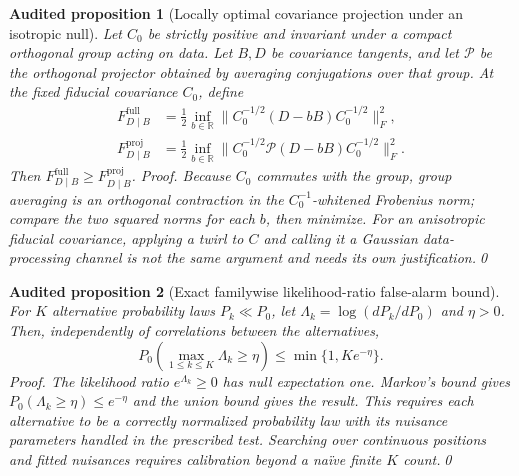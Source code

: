 \documentclass[aps,prd,onecolumn,notitlepage,groupedaddress,11pt]{revtex4-2}
\newtheorem{auditprop}{Audited proposition}[section]
\begin{document}
\begin{auditprop}[Locally optimal covariance projection under an isotropic null]\label{audit:fisher}
Let $C_0$ be strictly positive and invariant under a compact orthogonal group acting on data. Let $B,D$ be covariance tangents, and let $\mathcal P$ be the orthogonal projector obtained by averaging conjugations over that group. At the \emph{fixed fiducial covariance} $C_0$, define
\begin{align}\label{audit:fisherbound}
F_{D\mid B}^{\mathrm{full}}&=\tfrac12\inf_{b\in\mathbb R}\|C_0^{-1/2}(D-bB)C_0^{-1/2}\|_F^2,\\
F_{D\mid B}^{\mathrm{proj}}&=\tfrac12\inf_{b\in\mathbb R}\|C_0^{-1/2}\mathcal P(D-bB)C_0^{-1/2}\|_F^2.
\end{align}
Then $F_{D\mid B}^{\mathrm{full}}\ge F_{D\mid B}^{\mathrm{proj}}$. \emph{Proof.} Because $C_0$ commutes with the group, group averaging is an orthogonal contraction in the $C_0^{-1}$-whitened Frobenius norm; compare the two squared norms for each $b$, then minimize. For an anisotropic fiducial covariance, applying a twirl to $C$ and calling it a Gaussian data-processing channel is \emph{not} the same argument and needs its own justification.\qed
\end{auditprop}

\begin{auditprop}[Exact familywise likelihood-ratio false-alarm bound]\label{audit:chernoff}
For $K$ alternative probability laws $P_k\ll P_0$, let $\Lambda_k=\log(dP_k/dP_0)$ and $\eta>0$. Then, independently of correlations between the alternatives,
\begin{equation}\label{audit:chernoffbound}
 P_0\left(\max_{1\le k\le K}\Lambda_k\ge\eta\right)\le\min\{1,Ke^{-\eta}\}.
\end{equation}
\emph{Proof.} The likelihood ratio $e^{\Lambda_k}\ge0$ has null expectation one. Markov's bound gives $P_0(\Lambda_k\ge\eta)\le e^{-\eta}$ and the union bound gives the result. This requires each alternative to be a correctly normalized probability law with its nuisance parameters handled in the prescribed test. Searching over continuous positions and fitted nuisances requires calibration beyond a na\"ive finite $K$ count.\qed
\end{auditprop}
\end{document}
